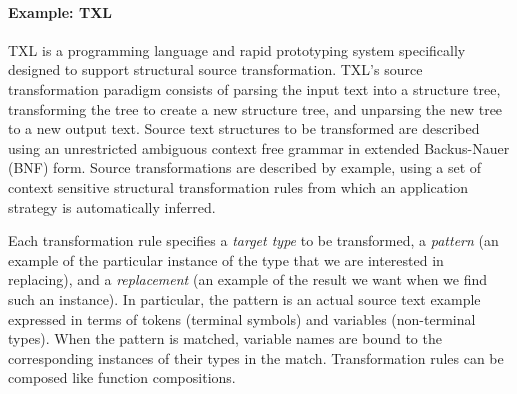 \paragraph{\textbf{Example: TXL}} TXL is a programming language and rapid prototyping system specifically designed to support structural source transformation. TXL's source transformation paradigm consists of parsing the input text into a structure tree, transforming the tree to create a new structure tree, and unparsing the new tree to a new output text. Source text structures to be transformed are described using an unrestricted ambiguous context free grammar in extended Backus-Nauer (BNF) form. Source transformations are described by example, using a set of context sensitive structural transformation rules from which an application strategy is automatically inferred. 

Each transformation rule specifies a {\em target type} to be transformed, a {\em pattern} (an example of the particular instance of the type that we are interested in replacing), and a {\em replacement} (an example of the result we want when we find such an instance). In particular, the pattern is an actual source text example expressed in terms of tokens (terminal symbols) and variables (non-terminal types). When the pattern is matched, variable names are bound to the corresponding instances of their types in the match. Transformation rules can be composed like function compositions.  




